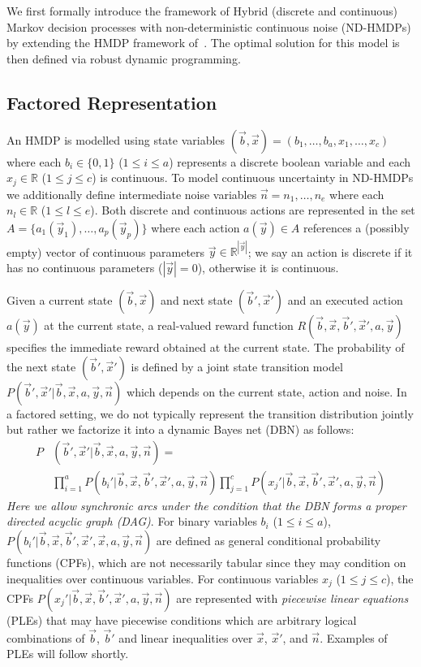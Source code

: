 We first formally introduce the framework of Hybrid (discrete and
continuous) Markov decision processes with non-deterministic
continuous noise (ND-HMDPs) by extending the HMDP framework 
of~\cite{sdp_aaai}. The optimal solution for this model is then defined
via robust dynamic programming.

\subsection{Factored Representation}

An HMDP is modelled using state variables $(\vec{b},\vec{x}) = (
b_1,\ldots,b_a,x_{1},\ldots,x_c )$ where each $b_i \in \{ 0,1 \}$
($1 \leq i \leq a$) represents a discrete boolean variable and
each $x_j \in \mathbb{R}$ ($1 \leq j \leq c$) is continuous.  To model
continuous uncertainty in ND-HMDPs we additionally define intermediate
noise variables $\vec{n} = n_1, \ldots , n_e$ where each
$n_l \in \mathbb{R}$ ($1 \leq l \leq e$).  Both discrete and
continuous actions are represented in the set $A
= \{a_1(\vec{y}_1), \ldots, a_p(\vec{y}_p) \}$ where each action
$a(\vec{y}) \in A$ references a (possibly empty) vector of continuous
parameters $\vec{y} \in \mathbb{R}^{|\vec{y}|}$; we say an action is
discrete if it has no continuous parameters ($|\vec{y}| = 0$), otherwise
it is continuous.

Given a current state $(\vec{b},\vec{x})$ and next state
$(\vec{b}',\vec{x}')$ and an executed action $a(\vec{y})$ 
at the current state, a real-valued reward function $R(\vec{b},\vec{x},\vec{b}',\vec{x}',a,\vec{y})$
specifies the immediate reward obtained at the current state. The probability of the
next state $(\vec{b}',\vec{x}')$ is defined by a joint state
transition model
$P(\vec{b}',\vec{x}'| \vec{b},\vec{x},a,\vec{y},\vec{n})$ which
depends on the current state, action and noise.
In a factored setting, we do not typically represent the transition
distribution jointly but rather we factorize it into a
dynamic Bayes net (DBN) as follows: %
{\footnotesize
\begin{align}
P&(\vec{b}',\vec{x}'|\vec{b},\vec{x}, a,\vec{y},\vec{n}) = \nonumber  \\
& \prod_{i=1}^a P(b_i'|\vec{b},\vec{x},\vec{b}',\vec{x}',a,\vec{y},\vec{n}) 
  \prod_{j=1}^c P(x_j'|\vec{b},\vec{x},\vec{b}',\vec{x}',a,\vec{y},\vec{n})
\end{align}
}
\emph{Here we allow synchronic arcs under the condition that the DBN forms
a proper directed acyclic graph (DAG)}.
For binary variables $b_i$ ($1 \leq i \leq a$),
$P(b_i'|\vec{b},\vec{x},\vec{b}',\vec{x}',\vec{x},a,\vec{y},\vec{n})$ are defined as
general conditional probability functions (CPFs), which are not necessarily tabular
since they may condition on inequalities over continuous variables.  For
continuous variables $x_j$ ($1 \leq j \leq c$), the CPFs
$P(x_j'|\vec{b},\vec{x},\vec{b}',\vec{x}',a,\vec{y},\vec{n})$ are represented
with \emph{piecewise linear equations} (PLEs) that may have piecewise 
conditions which are arbitrary logical combinations of
$\vec{b}$, $\vec{b}'$ and linear inequalities over $\vec{x}$, $\vec{x}'$,
and $\vec{n}$.  Examples of PLEs will follow shortly.

